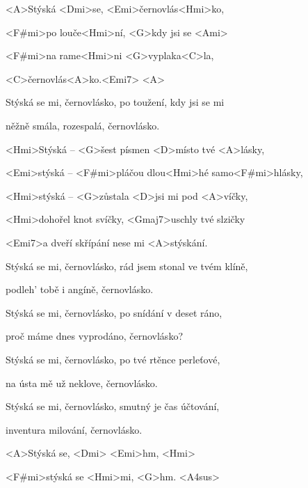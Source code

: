 

\zs
<A>Stýská <Dmi>se, <Emi>černovlás<Hmi>ko,

<F#mi>po louče<Hmi>ní, <G>kdy jsi se <Ami>

<F#mi>na rame<Hmi>ni <G>vyplaka<C>la,

<C>černovlás<A>ko.<Emi7> <A>
\ks

\zs
Stýská se mi, černovlásko, po toužení, kdy jsi se mi

něžně smála, rozespalá, černovlásko.
\ks

\zr
<Hmi>Stýská -- <G>šest písmen <D>místo tvé <A>lásky,

<Emi>stýská -- <F#mi>pláčou dlou<Hmi>hé samo<F#mi>hlásky,

<Hmi>stýská -- <G>zůstala <D>jsi mi pod <A>víčky,

<Hmi>dohořel knot svíčky, <Gmaj7>uschly tvé slzičky

<Emi7>a dveří skřípání nese mi <A>stýskání.
\kr

\zs
Stýská se mi, černovlásko, rád jsem stonal ve tvém klíně,

podleh' tobě i angíně, černovlásko.
\ks

\zs
Stýská se mi, černovlásko, po snídání v deset ráno,

proč máme dnes vyprodáno, černovlásko?
\ks


\zr \kr


\zs
Stýská se mi, černovlásko, po tvé rtěnce perleťové,

na ústa mě už neklove, černovlásko.
\ks

\zs
Stýská se mi, černovlásko, smutný je čas účtování,

inventura milování, černovlásko.
\ks

\zr \kr

\zr
<A>Stýská se, <Dmi> <Emi>hm, <Hmi>

<F#mi>stýská se <Hmi>mi, <G>hm. <A4sus>
\kr

\kp






